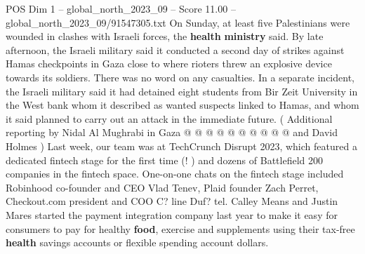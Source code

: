 \begin{textsample}{POS Dim 1 – global\_north\_2023\_09 – Score 11.00 – global\_north\_2023\_09/91547305.txt}
On Sunday, at least five Palestinians were wounded in clashes with Israeli forces, the \textbf{health} \textbf{ministry} said.
By late afternoon, the Israeli military said it conducted a second day of strikes against Hamas checkpoints in Gaza close to where rioters threw an explosive device towards its soldiers.
There was no word on any casualties.
In a separate incident, the Israeli military said it had detained eight students from Bir Zeit University in the West bank whom it described as wanted suspects linked to Hamas, and whom it said planned to carry out an attack in the immediate future. ( Additional reporting by Nidal Al Mughrabi in Gaza @ @ @ @ @ @ @ @ @ @ and David Holmes ) Last week, our team was at TechCrunch Disrupt 2023, which featured a dedicated fintech stage for the first time (! ) and dozens of Battlefield 200 companies in the fintech space.
One-on-one chats on the fintech stage included Robinhood co-founder and CEO Vlad Tenev, Plaid founder Zach Perret, Checkout.com president and COO C? line Duf? tel.
Calley Means and Justin Mares started the payment integration company last year to make it easy for consumers to pay for healthy \textbf{food}, exercise and supplements using their tax-free \textbf{health} savings accounts or flexible spending account dollars.

\end{textsample}
